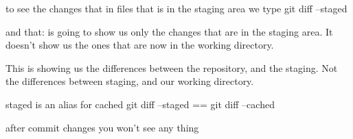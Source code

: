 to see the changes that in files that is in the staging area we type 
  git diff --staged 

and that:
  is going to show us only the changes that are in the staging area. 
  It doesn't show us the ones that are now in the working directory.

  This is showing us the differences between the repository, and the staging.
  Not the differences between staging, and our working directory.

  staged is an alias for cached
  git diff --staged == git diff --cached 

after commit changes you won't see any thing 